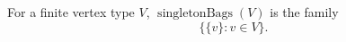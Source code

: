 For a finite vertex type \(V\), \(\operatorname{singletonBags}(V)\) is the family
\[
  \{\{v\}: v\in V\}.
\]
